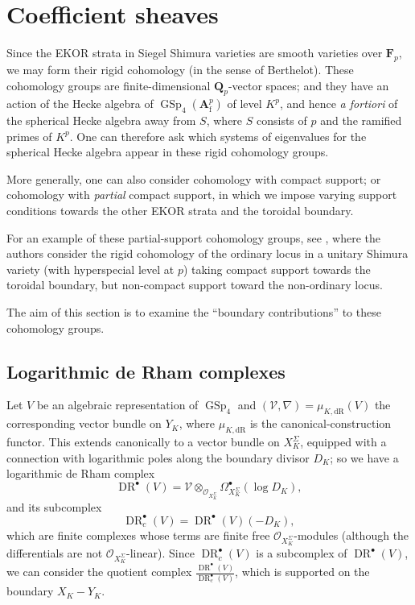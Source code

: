 \documentclass[cjm]{ipart}
\theoremstyle{plain}
\theoremstyle{remark}
\DeclareMathOperator{\DR}{DR}
\DeclareMathOperator{\GSp}{GSp}
\newcommand{\Af}{\AA_{\mathrm{f}}}
\newcommand{\Fp}{\mathbf{F}_p}
\newcommand{\QQ}{\mathbf{Q}}
\newcommand{\Qp}{\QQ_p}
\newcommand{\cO}{\mathcal{O}}
\newcommand{\cV}{\mathcal{V}}
\newcommand{\dR}{\mathrm{dR}}
\renewcommand{\AA}{\mathbf{A}}
\numberwithin{equation}{subsection}
\begin{document}
\section{Coefficient sheaves}

 Since the EKOR strata in Siegel Shimura varieties are smooth varieties over $\Fp$, we may form their rigid cohomology (in the sense of Berthelot). These cohomology groups are finite-dimensional $\Qp$-vector spaces; and they have an action of the Hecke algebra of $\GSp_4(\Af^p)$ of level $K^p$, and hence \emph{a fortiori} of the spherical Hecke algebra away from $S$, where $S$ consists of $p$ and the ramified primes of $K^p$. One can therefore ask which systems of eigenvalues for the spherical Hecke algebra appear in these rigid cohomology groups.

 More generally, one can also consider cohomology with compact support; or cohomology with \emph{partial} compact support, in which we impose varying support conditions towards the other EKOR strata and the toroidal boundary.

 \begin{remark}
  For an example of these partial-support cohomology groups, see \cite{HLTT16}, where the authors consider the rigid cohomology of the ordinary locus in a unitary Shimura variety (with hyperspecial level at $p$) taking compact support towards the toroidal boundary, but non-compact support toward the non-ordinary locus.
 \end{remark}

 The aim of this section is to examine the ``boundary contributions'' to these cohomology groups.

 \subsection{Logarithmic de Rham complexes}

  Let $V$ be an algebraic representation of $\GSp_4$ and $(\cV, \nabla) = \mu_{K, \dR}(V)$ the corresponding vector bundle on $Y_K$, where $\mu_{K, \dR}$ is the canonical-construction functor. This extends canonically to a vector bundle on $X_K^\Sigma$, equipped with a connection with logarithmic poles along the boundary divisor $D_K$; so we have a logarithmic de Rham complex
  \[ \DR^\bullet(V) = \cV \otimes_{\cO_{X^\Sigma_K}} \Omega^\bullet_{X^\Sigma_K}(\log D_K), \]
  and its subcomplex
  \[ \DR^\bullet_c(V) = \DR^\bullet(V)(-D_K),\]
  which are finite complexes whose terms are finite free $\cO_{X^\Sigma_K}$-modules (although the differentials are not $\cO_{X^\Sigma_K}$-linear). Since $\DR^\bullet_c(V)$ is a subcomplex of $\DR^\bullet(V)$, we can consider the quotient complex $\frac{\DR^\bullet(V)}{\DR^\bullet_c(V)}$, which is supported on the boundary $X_K - Y_K$.
\end{document}
